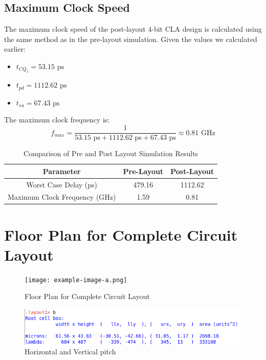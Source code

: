 \documentclass[conference]{IEEEtran}
\begin{document}
\subsection{Maximum Clock Speed}
The maximum clock speed of the post-layout 4-bit CLA design is calculated using the same method as in the pre-layout simulation. Given the values we calculated earlier:
\begin{itemize}
    \item $t_{CQ_1} = 53.15 \text{ ps}$
    \item $t_{pd} = 1112.62 \text{ ps}$
    \item $t_{su} = 67.43 \text{ ps}$
\end{itemize}

The maximum clock frequency is:
\begin{equation}
    f_{max} = \frac{1}{53.15 \text{ ps} + 1112.62 \text{ ps} + 67.43 \text{ ps}} \approx 0.81 \text{ GHz}
\end{equation}

\begin{table}[H]
    \centering
    \caption{Comparison of Pre and Post Layout Simulation Results}
    \begin{tabular}{|c|c|c|}
    \hline
    \rowcolor{cyan!10}
    \textbf{Parameter} & \textbf{Pre-Layout} & \textbf{Post-Layout} \\ \hline
    Worst Case Delay (ps) & 479.16 & 1112.62 \\ \hline
    Maximum Clock Frequency (GHz) & 1.59 & 0.81 \\ \hline
    \end{tabular}
    \label{tab:comparison}
\end{table}

\section{Floor Plan for Complete Circuit Layout}

\begin{figure}[H]
    \centering
    \texttt{[image: example-image-a.png]}
    \caption{Floor Plan for Complete Circuit Layout}
    \label{fig:floorplan}
\end{figure}

\begin{figure}[H]
    \centering
    \includegraphics[width=1\linewidth]{areapitch.png}
    \caption{Horizontal and Vertical pitch}
    \label{fig:floorplan}
\end{figure}
\end{document}
